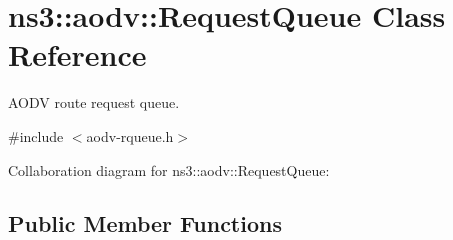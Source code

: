 \hypertarget{classns3_1_1aodv_1_1RequestQueue}{}\section{ns3\+:\+:aodv\+:\+:Request\+Queue Class Reference}
\label{classns3_1_1aodv_1_1RequestQueue}


A\+O\+DV route request queue.  




{\ttfamily \#include $<$aodv-\/rqueue.\+h$>$}



Collaboration diagram for ns3\+:\+:aodv\+:\+:Request\+Queue\+:
\subsection*{Public Member Functions}
